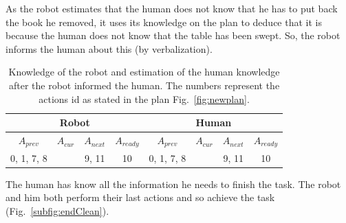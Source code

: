 \documentclass[english,a4paper,11pt,twoside]{StyleThese}
\begin{document}
As the robot estimates that the human does not know that he has to put back the book he removed, it uses its knowledge on the plan to deduce that it is because the human does not know that the table has been swept. So, the robot informs the human about this (by verbalization). 

\begin{table}[!h]
\begin{center}
\begin{tabular}{|c|c|c|c||c|c|c|c|}
\hline
\multicolumn{4}{|c||}{Robot} & \multicolumn{4}{c|}{Human}\\
\hline
$A_{prev}$ & $A_{cur}$ & $A_{next}$ & $A_{ready}$ & $A_{prev}$ & $A_{cur}$ & $A_{next}$ & $A_{ready}$\\
\hline
\hline
0, 1, 7, 8  &  & 9, 11 & 10 & 0, 1, 7, 8 &  & 9, 11 & 10\\
\hline
\end{tabular}
\end{center}
\caption{Knowledge of the robot and estimation of the human knowledge after the robot informed the human. The numbers represent the actions id as stated in the plan Fig.~\ref{fig:newplan}.}
\label{table:results}
\end{table}

The human has know all the information he needs to finish the task. The robot and him both perform their last actions and so achieve the task (Fig.~\ref{subfig:endClean}).
\end{document}
